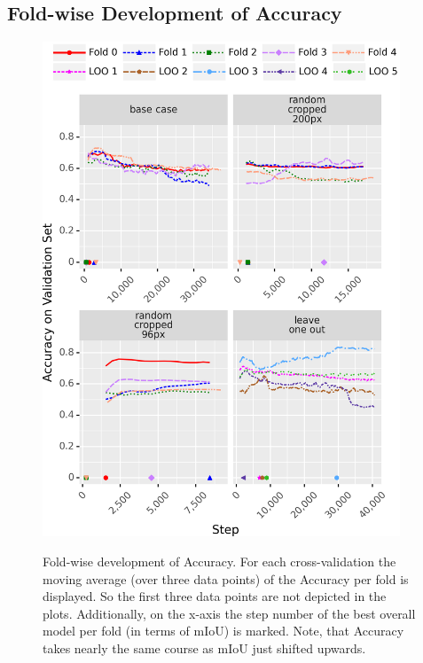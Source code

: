 \clearpage
\subsection{Fold-wise Development of Accuracy}
\begin{figure}[!hb]
    \centering  %
    \includegraphics[width=0.95\textwidth]{pictures/experiment_2/accuracy_base-case_final_base-case_loo_random_cropped_final_random_cropped_res96_final}\\
    \caption[Fold-wise Development of Accuracy]{Fold-wise development of Accuracy. For each cross-validation the moving average (over three data points) of the Accuracy per fold is displayed. So the first three data points are not depicted in the plots. Additionally, on the x-axis the step number of the best overall model per fold (in terms of mIoU) is marked. Note, that Accuracy takes nearly the same course as mIoU just shifted upwards. }
    \label{fig:accuracy-per-fold}
\end{figure}

